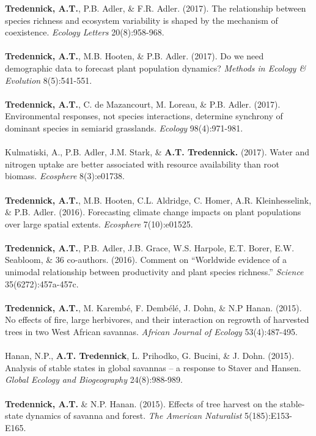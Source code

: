 \begin{pubentries}
\begin{\small}
{\bf{Tredennick, A.T.}}, P.B. Adler, \& F.R. Adler. (2017). The relationship between species richness and ecosystem variability is shaped by the mechanism of coexistence. \emph{Ecology Letters} 20(8):958-968. \\
\\
{\bf{Tredennick, A.T.}}, M.B. Hooten, \& P.B. Adler. (2017). Do we need demographic data to forecast plant population dynamics? \emph{Methods in Ecology \& Evolution} 8(5):541-551.\\
\\
{\bf{Tredennick, A.T.}}, C. de Mazancourt, M. Loreau, \& P.B. Adler. (2017). Environmental responses, not species interactions, determine synchrony of dominant species in semiarid grasslands. \emph{Ecology} 98(4):971-981.\\
\\
Kulmatiski, A., P.B. Adler, J.M. Stark, \& {\bf{A.T. Tredennick.}} (2017). Water and nitrogen uptake are better associated with resource availability than root biomass. \emph{Ecosphere} 8(3):e01738.\\
\\
{\bf{Tredennick, A.T.}}, M.B. Hooten, C.L. Aldridge, C. Homer, A.R. Kleinhesselink, \& P.B. Adler. (2016). Forecasting climate change impacts on plant populations over large spatial extents. \emph{Ecosphere} 7(10):e01525.\\
\\
{\bf{Tredennick, A.T.}}, P.B. Adler, J.B. Grace, W.S. Harpole, E.T. Borer, E.W. Seabloom, \& 36 co-authors. (2016). Comment on “Worldwide evidence of a unimodal relationship between productivity and plant species richness.” \emph{Science} 35(6272):457a-457c.\\
\\
{\bf{Tredennick, A.T.}}, M. Karemb\'{e}, F. Demb\'{e}l\'{e}, J. Dohn, \& N.P Hanan. (2015). No effects of fire, large herbivores, and their interaction on regrowth of harvested trees in two West African savannas. \emph{African Journal of Ecology} 53(4):487-495.\\
\\
Hanan, N.P., {\bf{A.T. Tredennick}}, L. Prihodko, G. Bucini, \& J. Dohn. (2015). Analysis of stable states in global savannas – a response to Staver and Hansen. \emph{Global Ecology and Biogeography} 24(8):988-989.\\
\\
{\bf{Tredennick, A.T.}} \& N.P. Hanan. (2015). Effects of tree harvest on the stable-state dynamics of savanna and forest. \emph{The American Naturalist} 5(185):E153-E165.\\

\end{\small}
\end{pubentries}
